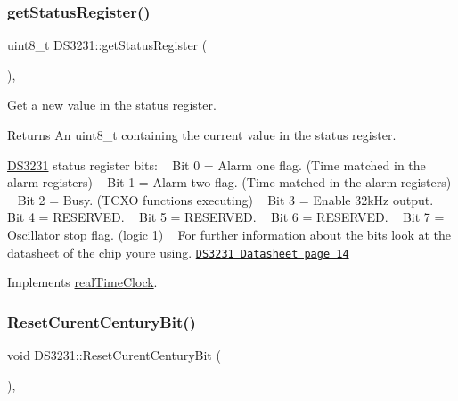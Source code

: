 \subsubsection{\texorpdfstring{get\+Status\+Register()}{getStatusRegister()}}
{\footnotesize\ttfamily uint8\+\_\+t D\+S3231\+::get\+Status\+Register (\begin{DoxyParamCaption}{ }\end{DoxyParamCaption})\hspace{0.3cm}{\ttfamily [override]}, {\ttfamily [virtual]}}



Get a new value in the status register. 

\begin{DoxyReturn}{Returns}
An uint8\+\_\+t containing the current value in the status register.
\end{DoxyReturn}
\mbox{\hyperlink{class_d_s3231}{D\+S3231}} status register bits\+: ~\newline
 Bit 0 = Alarm one flag. (Time matched in the alarm registers) ~\newline
 Bit 1 = Alarm two flag. (Time matched in the alarm registers) ~\newline
 Bit 2 = Busy. (T\+C\+XO functions executing) ~\newline
 Bit 3 = Enable 32k\+Hz output. ~\newline
 Bit 4 = R\+E\+S\+E\+R\+V\+ED. ~\newline
 Bit 5 = R\+E\+S\+E\+R\+V\+ED. ~\newline
 Bit 6 = R\+E\+S\+E\+R\+V\+ED. ~\newline
 Bit 7 = Oscillator stop flag. (logic 1) ~\newline
 For further information about the bits look at the datasheet of the chip you\textquotesingle{}re using. \href{https://datasheets.maximintegrated.com/en/ds/DS3231.pdf}{\tt D\+S3231 Datasheet page 14} 

Implements \mbox{\hyperlink{classreal_time_clock_a38dcc51b0b30a5e480ea7f18f2c792ba}{real\+Time\+Clock}}.

\mbox{\label{class_d_s3231_a6477bd1bb91d3df6a088c369692f46a3}} 
\subsubsection{\texorpdfstring{Reset\+Curent\+Century\+Bit()}{ResetCurentCenturyBit()}}
{\footnotesize\ttfamily void D\+S3231\+::\+Reset\+Curent\+Century\+Bit (\begin{DoxyParamCaption}{ }\end{DoxyParamCaption})\hspace{0.3cm}{\ttfamily [override]}, {\ttfamily [virtual]}}




